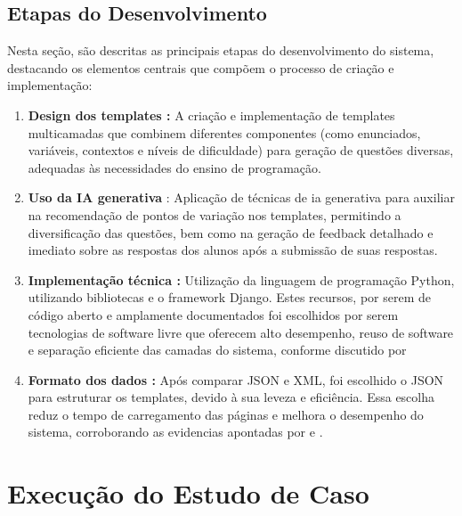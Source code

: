 \subsection{Etapas do Desenvolvimento}
Nesta seção, são descritas as principais etapas do desenvolvimento do sistema, destacando os elementos centrais que compõem o processo de criação e implementação: 

\begin{enumerate}[label=\textbf{\alph*)}]
    \item \textbf{Design dos templates :}  A criação e implementação de templates multicamadas que combinem diferentes componentes (como enunciados, variáveis, contextos e níveis de dificuldade) para geração de questões diversas, adequadas às necessidades do ensino de programação.
    \item \textbf{Uso da IA generativa} : Aplicação de técnicas de \gls{ia} generativa para auxiliar na recomendação de pontos de variação nos templates, permitindo a diversificação das questões, bem como na geração de feedback detalhado e imediato sobre as respostas dos alunos após a submissão de suas respostas. 
    \item \textbf{Implementação técnica :}  Utilização da linguagem de programação Python, utilizando bibliotecas e o framework Django. Estes recursos, por serem de código aberto e amplamente documentados foi escolhidos por serem tecnologias de software livre que oferecem alto desempenho, reuso de software e separação eficiente das camadas do sistema, conforme discutido por  \parencite{rubio2017}
    \item \textbf{Formato dos dados :}  Após comparar JSON e XML, foi escolhido o JSON para estruturar os templates, devido à sua leveza e eficiência. Essa escolha reduz o tempo de carregamento das páginas e melhora o desempenho do sistema, corroborando as evidencias apontadas por  \parencite{goyal2017} e \parencite{wang2011} .
\end{enumerate}

\section{Execução do Estudo de Caso}

